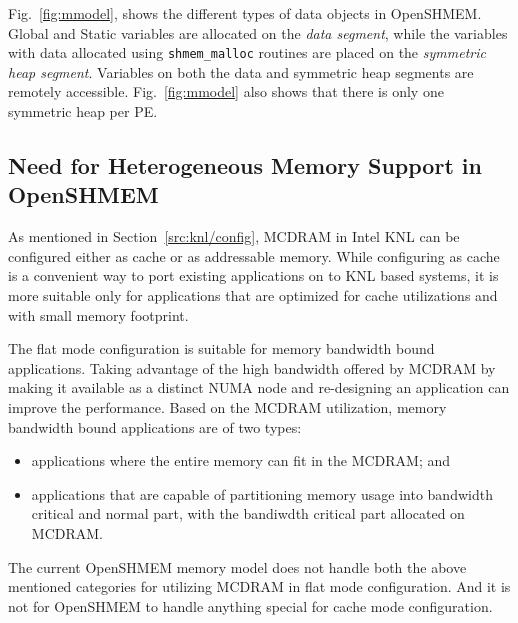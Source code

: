 Fig.~\ref{fig:mmodel}, shows the different types of data objects in
OpenSHMEM. Global and Static variables are allocated on the
\emph{data segment}, while the variables with data allocated using
\texttt{shmem\_malloc} routines are placed on the \emph{symmetric heap
segment}. Variables on both the data and symmetric heap segments are
remotely accessible. Fig.~\ref{fig:mmodel} also shows that there is only
one symmetric heap per PE. %

\subsection{Need for Heterogeneous Memory Support in OpenSHMEM}
\label{src:mmodel/drelated}
As mentioned in Section~\ref{src:knl/config}, MCDRAM in Intel KNL can be
configured either as cache or as addressable memory. While configuring as
cache is a convenient way to port existing applications on to KNL based
systems, it is more suitable only for applications that are optimized for
cache utilizations and with small memory footprint.

The flat mode configuration is suitable for memory bandwidth bound
applications. Taking advantage of the high bandwidth offered by MCDRAM by
making it available as a distinct NUMA node and re-designing an application
can improve the performance. Based on the MCDRAM utilization, memory
bandwidth bound applications are of two types:
\begin{itemize}
    \item applications where the entire memory can fit in the MCDRAM; and
    \item applications that are capable of partitioning memory usage into
    bandwidth critical and normal part, with the bandiwdth critical part
    allocated on MCDRAM.
\end{itemize}
The current OpenSHMEM memory model does not handle both the above mentioned
categories for utilizing MCDRAM in flat mode configuration. And it is not
for OpenSHMEM to handle anything special for cache mode configuration.
